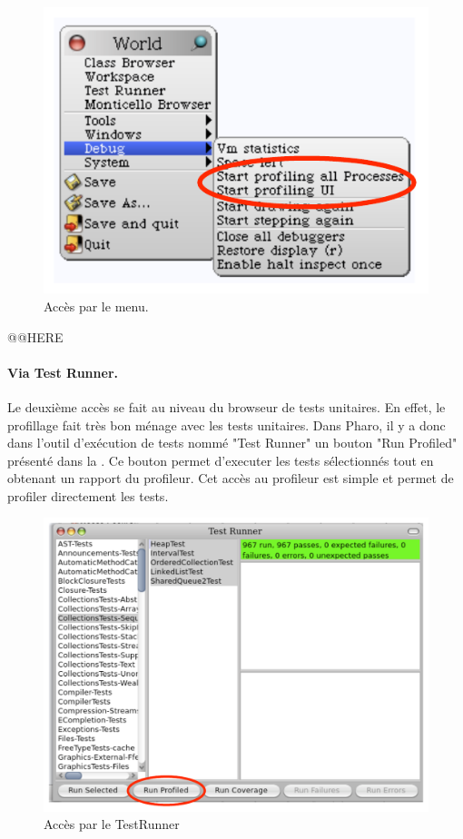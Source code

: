 \documentclass[a4paper,10pt,twoside]{book}
\begin{document}
\begin{figure}[h]
	\begin{center}
	\includegraphics[width=.6\linewidth]{menu}
	\caption{Acc\`es par le menu.}
	\end{center}
\end{figure}



@@HERE
\paragraph{Via Test Runner.}
Le deuxi\`eme acc\`es se fait au niveau du browseur de tests unitaires. En effet, le profillage fait tr\`es bon m\'enage avec les tests unitaires. Dans Pharo, il y a donc dans l'outil d'ex\'ecution de tests nomm\'e "Test Runner" un bouton "Run Profiled" pr\'esent\'e dans la . Ce bouton permet d'executer les tests s\'electionn\'es tout en obtenant un rapport du profileur. Cet acc\`es au profileur est simple et permet de profiler directement les tests.

\begin{figure}[h]
	\begin{center}
	\includegraphics[width=.8\linewidth]{testRunner}
	\caption{Acc\`es par le TestRunner}
	\end{center}
\end{figure}
\end{document}
